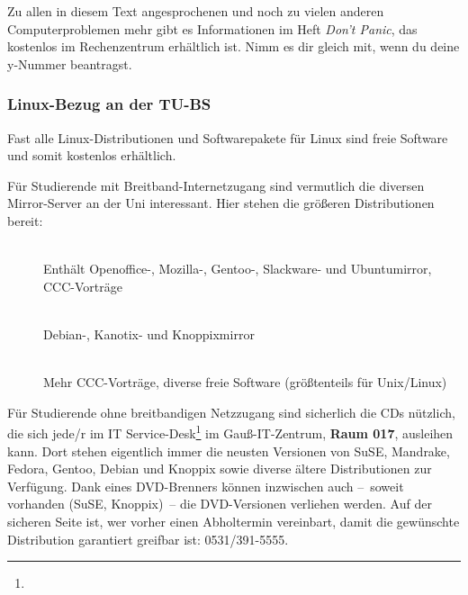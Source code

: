		Zu allen in diesem Text angesprochenen und noch zu vielen anderen Computerproblemen mehr gibt es Informationen im Heft \emph{Don't Panic}, das kostenlos im Rechenzentrum erhältlich ist. Nimm es dir gleich mit, wenn du deine y-Nummer beantragst.

	\subsubsection{Linux-Bezug an der TU-BS}
		Fast alle Linux-Distributionen und Softwarepakete für Linux sind freie Software und somit kostenlos erhältlich.

		Für Studierende mit Breitband-Internetzugang sind vermutlich die diversen Mirror-Server an der Uni interessant. Hier stehen die größeren Distributionen bereit:
	  
		\begin{description}
			\item[]~\\Enthält Openoffice-, Mozilla-, Gentoo-, Slackware- und Ubuntumirror, CCC-Vorträge
			\item[]~\\Debian-, Kanotix- und Knoppixmirror
			\item[]~\\Mehr CCC-Vorträge, diverse freie Software (größtenteils für Unix/Linux)
		\end{description}

		Für Studierende ohne breitbandigen Netzzugang sind sicherlich die CDs nützlich, die sich jede/r im IT Service-Desk\footnote{} im Gauß-IT-Zentrum, \textbf{Raum 017}, ausleihen kann. Dort stehen eigentlich immer die neusten Versionen von SuSE, Mandrake, Fedora, Gentoo, Debian und Knoppix sowie diverse ältere Distributionen zur Verfügung. Dank eines DVD-Brenners können inzwischen auch --~soweit vorhanden (SuSE, Knoppix)~-- die DVD-Versionen verliehen werden. Auf der sicheren Seite ist, wer vorher einen Abholtermin vereinbart, damit die gewünschte Distribution garantiert greifbar ist: 0531/391-5555.
